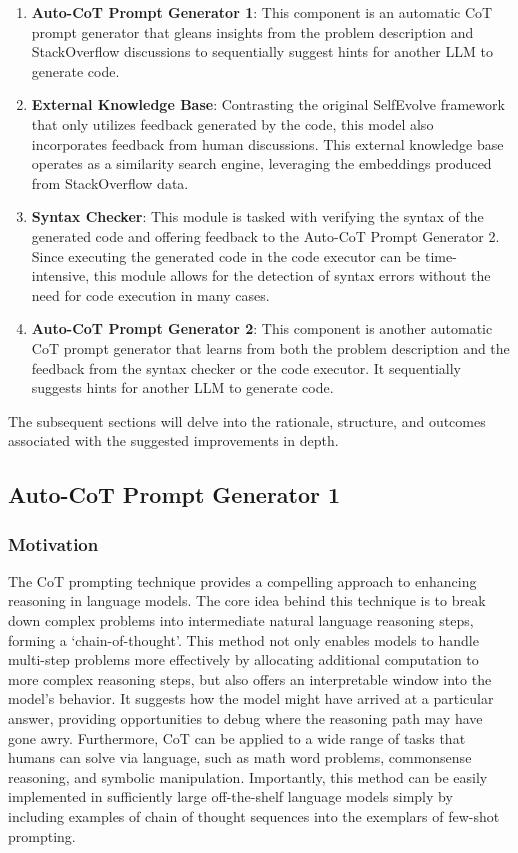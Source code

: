 \documentclass[a4paper,oneside]{book}
\begin{document}
\begin{enumerate}
    \item \textbf{Auto-CoT Prompt Generator 1}: This component is an automatic CoT prompt generator that gleans insights from the problem description and StackOverflow discussions to sequentially suggest hints for another LLM to generate code.
    \item \textbf{External Knowledge Base}: Contrasting the original SelfEvolve framework that only utilizes feedback generated by the code, this model also incorporates feedback from human discussions. This external knowledge base operates as a similarity search engine, leveraging the embeddings produced from StackOverflow data.
    \item \textbf{Syntax Checker}: This module is tasked with verifying the syntax of the generated code and offering feedback to the Auto-CoT Prompt Generator 2. Since executing the generated code in the code executor can be time-intensive, this module allows for the detection of syntax errors without the need for code execution in many cases.
    \item \textbf{Auto-CoT Prompt Generator 2}: This component is another automatic CoT prompt generator that learns from both the problem description and the feedback from the syntax checker or the code executor. It sequentially suggests hints for another LLM to generate code.
\end{enumerate}

The subsequent sections will delve into the rationale, structure, and outcomes associated with the suggested improvements in depth.

\subsection{Auto-CoT Prompt Generator 1}
\subsubsection{Motivation}
The CoT prompting technique provides a compelling approach to enhancing reasoning in language models. The core idea behind this technique is to break down complex problems into intermediate natural language reasoning steps, forming a `chain-of-thought'. This method not only enables models to handle multi-step problems more effectively by allocating additional computation to more complex reasoning steps, but also offers an interpretable window into the model's behavior. It suggests how the model might have arrived at a particular answer, providing opportunities to debug where the reasoning path may have gone awry. Furthermore, CoT can be applied to a wide range of tasks that humans can solve via language, such as math word problems, commonsense reasoning, and symbolic manipulation. Importantly, this method can be easily implemented in sufficiently large off-the-shelf language models simply by including examples of chain of thought sequences into the exemplars of few-shot prompting.
\end{document}

